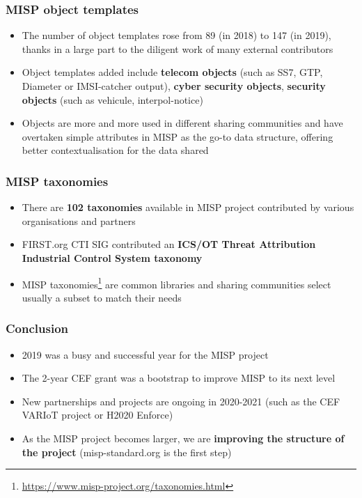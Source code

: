 \begin{frame}
        \frametitle{MISP object templates}
        \begin{itemize}
                \item The number of object templates rose from 89 (in 2018) to 147 (in 2019), thanks in a large part to the diligent work of many external contributors
                \item Object templates added include {\bf telecom objects} (such as SS7, GTP, Diameter or IMSI-catcher output), {\bf cyber security objects}, {\bf security objects} (such as vehicule, interpol-notice)
                \item Objects are more and more used in different sharing communities and have overtaken simple attributes in MISP as the go-to data structure, offering better contextualisation for the data shared
        \end{itemize}
\end{frame}

\begin{frame}
        \frametitle{MISP taxonomies}
        \begin{itemize}
                \item There are {\bf 102 taxonomies} available in MISP project contributed by various organisations and partners
                \item FIRST.org CTI SIG contributed an {\bf ICS/OT Threat Attribution Industrial Control System taxonomy}
                \item MISP taxonomies\footnote{\url{https://www.misp-project.org/taxonomies.html}} are common libraries and sharing communities select usually a subset to match their needs
        \end{itemize}
\end{frame}


\begin{frame}
        \frametitle{Conclusion}
        \begin{itemize}
                \item 2019 was a busy and successful year for the MISP project
                \item The 2-year CEF grant was a bootstrap to improve MISP to its next level
                \item New partnerships and projects are ongoing in 2020-2021 (such as the CEF VARIoT project or H2020 Enforce)
                \item As the MISP project becomes larger, we are {\bf improving the structure of the project} (misp-standard.org is the first step)
        \end{itemize}
\end{frame}

